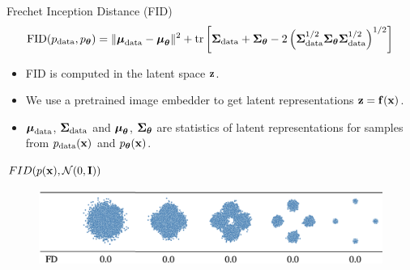 \documentclass{beamer}
\begin{document}
\begin{frame}{Frechet Inception Distance (FID)}
	\vspace{-0.3cm}
	\[
		\mathrm{FID} (p_{\text{data}}, p_{\boldsymbol{\theta}}) = \| \boldsymbol{\mu}_{\text{data}} - \boldsymbol{\mu}_{\boldsymbol{\theta}}\|^2 + \text{tr} \left[ \boldsymbol{\Sigma}_{\text{data}} + \boldsymbol{\Sigma}_{\boldsymbol{\theta}} - 2 \left(\boldsymbol{\Sigma}_{\text{data}}^{1/2} \boldsymbol{\Sigma}_{\boldsymbol{\theta}} \boldsymbol{\Sigma}_{\text{data}}^{1/2} \right)^{1/2} \right]
	\]
	\vspace{-0.5cm}
	\begin{itemize}
		\item FID is computed in the latent space $\mathbf{z}$.
		\item We use a pretrained image embedder to get latent representations $\mathbf{z} = \mathbf{f}(\mathbf{x})$.
		\item $\boldsymbol{\mu}_{\text{data}}$, $\boldsymbol{\Sigma}_{\text{data}}$ and $\boldsymbol{\mu}_{\boldsymbol{\theta}}$, $\boldsymbol{\Sigma}_{\boldsymbol{\theta}}$ are statistics of latent representations for samples from $p_{\text{data}}(\mathbf{x})$ and $p_{\boldsymbol{\theta}}(\mathbf{x})$.
	\end{itemize}
	\eqpause
	\begin{block}{$FID(p(\mathbf{x}), \mathcal{N}(0, \mathbf{I}))$}
		\begin{figure}
			\includegraphics[width=0.95\linewidth]{figs/fid_normal}
		\end{figure}
	\end{block}
\end{frame}
\end{document}
